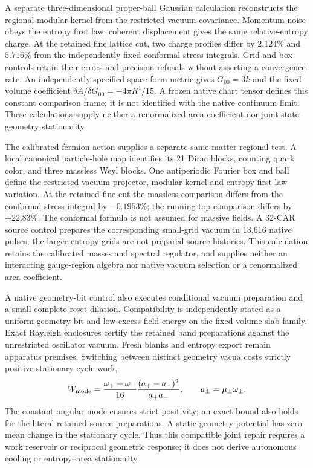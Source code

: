 A separate three-dimensional proper-ball Gaussian calculation reconstructs
the regional modular kernel from the restricted vacuum covariance. Momentum
noise obeys the entropy first law; coherent displacement gives the same
relative-entropy charge. At the retained fine lattice cut, two charge
profiles differ by \(2.124\%\) and \(5.716\%\) from the independently fixed
conformal stress integrals. Grid and box controls retain their errors and
precision refusals without asserting a convergence rate. An independently
specified space-form metric gives \(G_{00}=3k\) and the fixed-volume
coefficient \(\delta A/\delta G_{00}=-4\pi R^4/15\). A frozen native chart
tensor defines this constant comparison frame; it is not identified with
the native continuum limit. These calculations supply neither a
renormalized area coefficient nor joint state--geometry stationarity.

The calibrated fermion action supplies a separate same-matter regional test.
A local canonical particle-hole map identifies its 21 Dirac blocks, counting quark color,
and three massless Weyl blocks. One antiperiodic Fourier box and ball define
the restricted vacuum projector, modular kernel and entropy first-law
variation. At the retained fine cut the massless comparison differs from
the conformal stress integral by \(-0.1953\%\); the running-top comparison
differs by \(+22.83\%\). The conformal formula is not assumed for massive
fields. A 32-CAR source control prepares the corresponding small-grid
vacuum in 13,616 native pulses; the larger entropy grids are not prepared
source histories. This calculation retains the calibrated masses and
spectral regulator, and supplies neither an interacting gauge-region
algebra nor native vacuum selection or a renormalized area coefficient.

A native geometry-bit control also executes conditional vacuum preparation
and a small complete reset dilation. Compatibility is independently stated
as a uniform geometry bit and low excess field energy on the fixed-volume
slab family. Exact Rayleigh enclosures certify the retained band preparations
against the unrestricted oscillator vacuum. Fresh blanks and entropy export
remain apparatus premises. Switching between distinct geometry vacua costs
strictly positive stationary cycle work,
\[
 W_{\rm mode}=\frac{\omega_++\omega_-}{16}
       \frac{(a_+-a_-)^2}{a_+a_-},\qquad a_\pm=\mu_\pm\omega_\pm.
\]
The constant angular mode ensures strict positivity; an exact bound also
holds for the literal retained source preparations. A static geometry
potential has zero mean change in the stationary cycle. Thus this compatible
joint repair requires a work reservoir or reciprocal geometric response;
it does not derive autonomous cooling or entropy--area stationarity.

